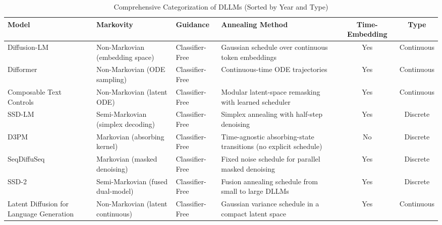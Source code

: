 \begin{table*}[ht!]
  \centering
  \caption{Comprehensive Categorization of DLLMs (Sorted by Year and Type)}
  \label{tbl:dllm-comprehensive}
  \begin{tabularx}{\textwidth}{X  X  X  >{\RaggedRight\hyphenpenalty=50\tolerance=1000}X  c  c}
    \toprule
    \textbf{Model} & \textbf{Markovity} & \textbf{Guidance} & \textbf{Annealing Method} & \textbf{Time-Embedding} & \textbf{Type} \\
    \midrule

    Diffusion-LM \cite{li_diffusion-lm_2022}
      & Non-Markovian (embedding space)
      & Classifier-Free
      & Gaussian schedule over continuous token embeddings
      & Yes
      & Continuous \\

    Difformer \cite{gong_difformer_2022}
      & Non-Markovian (ODE sampling)
      & Classifier-Free
      & Continuous-time ODE trajectories
      & Yes
      & Continuous \\

    Composable Text Controls \cite{liu_composable_2022}
      & Non-Markovian (latent ODE)
      & Classifier-Free
      & Modular latent-space remasking with learned scheduler
      & Yes
      & Continuous \\

    SSD-LM \cite{han_ssdlm_2022}
      & Semi-Markovian (simplex decoding)
      & Classifier-Free
      & Simplex annealing with half-step denoising
      & Yes
      & Discrete \\

    D3PM \cite{hoogeboom_structured_2021}
      & Markovian (absorbing kernel)
      & Classifier-Free
      & Time-agnostic absorbing-state transitions (no explicit schedule)
      & No
      & Discrete \\

    SeqDiffuSeq \cite{yuan_seqdiffuseq_2021}
      & Markovian (masked denoising)
      & Classifier-Free
      & Fixed noise schedule for parallel masked denoising
      & Yes
      & Discrete \\

    SSD-2 \cite{han_ssd-lm_2023}
      & Semi-Markovian (fused dual-model)
      & Classifier-Free
      & Fusion annealing schedule from small to large DLLMs
      & Yes
      & Discrete \\

    Latent Diffusion for Language Generation \cite{lovelace_latent_2023}
      & Non-Markovian (latent continuous)
      & Classifier-Free
      & Gaussian variance schedule in a compact latent space
      & Yes
      & Continuous \\


\end{tabularx}
\end{table*}
